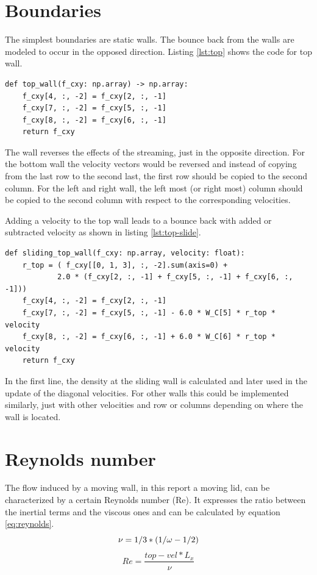 \section{Boundaries}
The simplest boundaries are static walls. 
The bounce back from the walls are modeled to occur in the opposed direction. 
Listing \ref{lst:top} shows the code for top wall.
\begin{center}
  \begin{lstlisting}[caption=Bounce back at the top wall.,label=lst:top, basicstyle=\small]
def top_wall(f_cxy: np.array) -> np.array:
    f_cxy[4, :, -2] = f_cxy[2, :, -1]
    f_cxy[7, :, -2] = f_cxy[5, :, -1]
    f_cxy[8, :, -2] = f_cxy[6, :, -1]
    return f_cxy
  \end{lstlisting}
\end{center}
The wall reverses the effects of the streaming, just in the opposite direction.
For the bottom wall the velocity vectors would be reversed and instead of copying from the last row to the second last, the first row should be copied to the second column.
For the left and right wall, the left most (or right most) column should be copied to the second column with respect to the corresponding velocities.

Adding a velocity to the top wall leads to a bounce back with added or subtracted velocity as shown in listing \ref{lst:top-slide}. 
\begin{center}
  \begin{lstlisting}[caption=Bounce back at the top sliding wall.,label=lst:top-slide, basicstyle=\small]
def sliding_top_wall(f_cxy: np.array, velocity: float):
    r_top = ( f_cxy[[0, 1, 3], :, -2].sum(axis=0) + 
            2.0 * (f_cxy[2, :, -1] + f_cxy[5, :, -1] + f_cxy[6, :, -1]))
    f_cxy[4, :, -2] = f_cxy[2, :, -1]
    f_cxy[7, :, -2] = f_cxy[5, :, -1] - 6.0 * W_C[5] * r_top * velocity
    f_cxy[8, :, -2] = f_cxy[6, :, -1] + 6.0 * W_C[6] * r_top * velocity
    return f_cxy
  \end{lstlisting}
\end{center}
In the first line, the density at the sliding wall is calculated and later used in the update of the diagonal velocities. For other walls this could be implemented similarly, just with other velocities and row or columns depending on where the wall is located.

\section{Reynolds number}
The flow induced by a moving wall, in this report a moving lid, can be characterized by a certain Reynolds number (Re).
It expresses the ratio between the inertial terms and the viscous ones and can be calculated by equation \ref{eq:reynolds}.
\begin{equation}
    \nu = 1 / 3 * (1 / \omega - 1 / 2) \\
\end{equation}
\begin{equation}\label{eq:reynolds}
     Re = \frac{top-vel * L_x}{\nu}
\end{equation}


